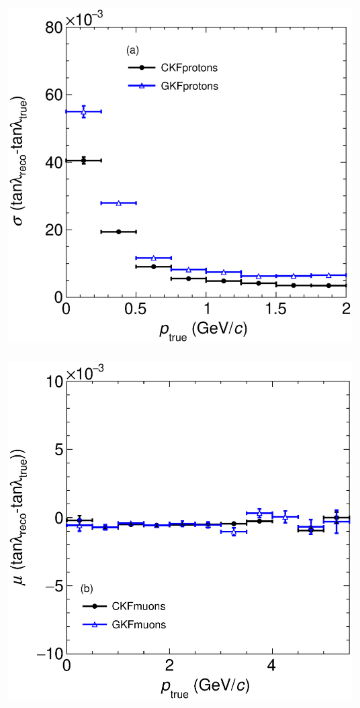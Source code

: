 \begin{figure}[t]
\begin{subfigure}{0.32\textwidth}
         \caption{}
         \label{fig:tanlambdaResVSp211_Int}
     \end{subfigure}
    \begin{subfigure}{0.32\textwidth}
         \centering
         \includegraphics[width=\textwidth]{figures/ch5-KF_NDGAr/FullSample/Int/Angle_Res/tanlambda/RestanlambdaVSp_2212.eps}
         \caption{}
         \label{fig:tanlambdaResVSp2212_Int}
     \end{subfigure}
          \begin{subfigure}{0.32\textwidth}
         \centering
         \includegraphics[width=\textwidth]{figures/ch5-KF_NDGAr/FullSample/Int/Angle_Res/tanlambda/BiastanlambdaVSp_13.eps}

\end{subfigure}
\end{figure}

